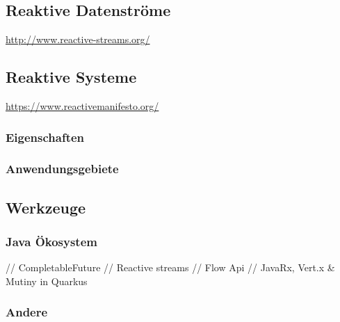 \subsection{Reaktive Datenströme}
\label{section.reaktive_datenströme}

\url{http://www.reactive-streams.org/}
\parencite{ReactiveStreams}

\subsection{Reaktive Systeme}
\label{section:reaktive_systeme}

\url{https://www.reactivemanifesto.org/}
\parencite{ReactiveSystems}

\subsubsection{Eigenschaften}

\subsubsection{Anwendungsgebiete}

\subsection{Werkzeuge}
\subsubsection{Java Ökosystem}
// CompletableFuture
// Reactive streams
// Flow Api
// JavaRx, Vert.x \& Mutiny in Quarkus
\subsubsection{Andere}

